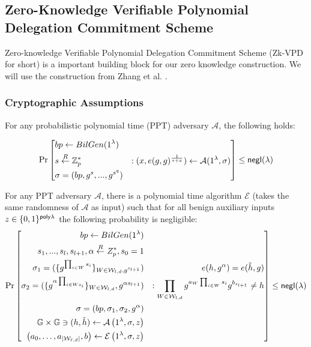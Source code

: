 
\subsection{Zero-Knowledge Verifiable Polynomial Delegation Commitment Scheme}

Zero-knowledge Verifiable Polynomial Delegation Commitment Scheme (Zk-VPD for short) is a important building block for our zero knowledge construction. We will use the construction from Zhang et al. \cite{zkvpd}.

\subsubsection{Cryptographic Assumptions}

\begin{assumption}
	\label{asp::qSDH}
	For any probabilistic polynomial time (PPT) adversary $\mathcal{A}$, the following holds:

	\[\Pr\left[ \begin{aligned}
		&bp \leftarrow BilGen(1^\lambda) & \\
		&s \overset{R}{\leftarrow} \mathbb{Z}^{*}_{p} & : (x, e(g, g)^{\frac{1}{s+x}}) \leftarrow \mathcal{A}(1^\lambda, \sigma)\\
		&\sigma = (bp, g^s, ..., g^{s^q})
	\end{aligned} \right] \le {\sf negl}{(\lambda)}\]
\end{assumption}
\begin{assumption}
	\label{asp::dlEPKE}
	For any PPT adversary $\mathcal{A}$, there is a polynomial time algorithm $\mathcal{E}$ (takes the same randomness of $\mathcal{A}$ as input) such that for all benign auxiliary inputs $z \in \{0,1\}^{{\sf poly}{\lambda}}$ the following probability is negligible:
	\[\Pr\left[ \begin{aligned}
					bp \leftarrow BilGen(1^\lambda) && \\
					s_1, ..., s_l, s_{l + 1}, \alpha \overset{R}{\leftarrow} Z_{p}^*, s_0=1 && \\
					\sigma_1 = (\{g^{\prod_{i\in W}s_i}\}_{W\in \mathcal{W}_{l, d}, g^{s_{l+1}}}) &&\hspace*{30pt} e(h, g^\alpha)=e(\tilde{h}, g)\\
					\sigma_2 = (\{g^{\alpha\prod_{i\in Ws_i}}\}_{W\in \mathcal{W}_{l, d}}, g^{\alpha s_{l+1}}) && : \prod_{W\in \mathcal{W}_{l, d}}g^{a_{W}\prod_{i\in W}s_i}g^{b_{s_{l+1}}}\neq h\\
					\sigma = (bp, \sigma_1, \sigma_2, g^{\alpha}) && \\
					\mathbb{G} \times \mathbb{G} \ni (h, \tilde{h}) \leftarrow \mathcal{A} \left(1^{\lambda}, \sigma, z\right)&& \\
					\left( a _ { 0 } , \dots , a _ { \left| \mathcal { W } _ { \ell , d } \right| } , b \right) \leftarrow \mathcal { E } \left( 1 ^ { \lambda } , \sigma , z \right) &&
				\end{aligned}\right] \le {\sf negl}{(\lambda)}\]
\end{assumption}

